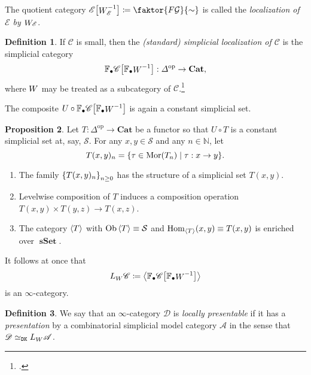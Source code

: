 \documentclass[10pt,letterpaper,cm]{nupset}
\theoremstyle{definition}
\newtheorem{definition}{Definition}[subsection]
\theoremstyle{theorem}
\newtheorem{prop}[definition]{Proposition}
\theoremstyle{remark}
\DeclareMathOperator{\ob}{Ob}
\DeclareMathOperator{\mor}{Mor}
\newcommand{\0}{\mathbf{0}}
\newcommand{\1}{\mathbf{1}}
\newcommand{\2}{\mathbf{2}}
\DeclareMathOperator{\op}{op}
\DeclareMathOperator{\sset}{\mathbf{sSet}}
\renewcommand{\c}{\mathscr{C}}
\renewcommand{\d}{\mathscr{D}}
\newcommand{\e}{\mathscr{E}}
\newcommand{\N}{\mathbb N}
\DeclareMathOperator{\Hom}{Hom}
\DeclareMathOperator{\we}{\mathnormal{W}}
\newcommand{\be}{\begin{enumerate}}
\newcommand{\ee}{\end{enumerate}}
\begin{document}
The quotient category $\e\mleft[\we_{\e}^{-1}\mright] \coloneqq \faktor{F{\mathcal{G}}}{\sim}$ is called the \textit{localization of $\e$ by $\we_{\e}$}.

\smallskip

\begin{definition}
If $\c$ is small, then the \textit{(standard) simplicial localization of $\c$} is the simplicial category $$\mathbb{F}_{\bullet}{\c}\mleft[\mathbb{F}_{\bullet}{\we}^{-1}\mright] : \varDelta^{\op} \to \mathbf{Cat},$$ where $\we$ may be treated as a subcategory of $\c$.\footnote{\autocite[Section 4.1]{DKan}.}
\end{definition}

The composite $U\circ \mathbb{F}_{\bullet}{\c}\mleft[\mathbb{F}_{\bullet}{\we}^{-1}\mright]$ is again a constant simplicial set.

\begin{prop}
Let $T : \varDelta^{\op} \to \mathbf{Cat}$ be a functor so that $U\circ T$ is a constant simplicial set at, say, $\mathcal{S}$. For any $x,y\in \mathcal{S}$ and any $n\in \N$, let
\[
T(x,y)_n =\mleft\{ \tau \in \mor(T_n) \mid \tau : x\to y\mright\}.
\] 
\be[label=(\alph*)]
\item The family $\mleft\{T(x,y)_n\mright\}_{n\geq 0}$ has the structure of a simplicial set $T(x,y)$.
\item Levelwise composition of $T$ induces a composition operation $T(x,y) \times T(y,z) \to T(x,z)$.
\item The category $\mleft\langle T \mright\rangle$ with $\ob{\mleft\langle T \mright\rangle} \equiv \mathcal{S}$ and $\Hom_{\mleft\langle T \mright\rangle}(x,y) \equiv T(x,y)$ is enriched over $\sset$.
\ee

\end{prop}

It follows at once that $$L_{\we}{\c} \coloneqq \mleft\langle\mathbb{F}_{\bullet}{\c}\mleft[\mathbb{F}_{\bullet}{\we}^{-1}\mright]\mright\rangle$$ is an $\infty$-category.

\begin{definition}
We say that an $\infty$-category $\d$ is \textit{locally presentable} if it has a \textit{presentation} by a combinatorial simplicial model category  $\mathscr{A}$   in the sense that $\d \simeq_{\mathtt{DK}} L_{\we}{\mathscr{A}}$.
\end{definition}
\end{document}
